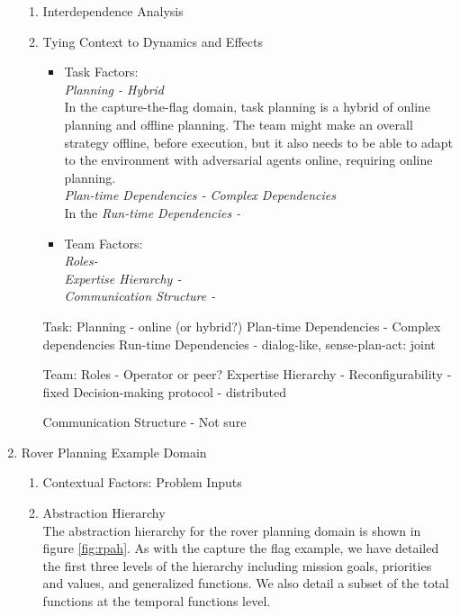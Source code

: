 \documentclass[letterpaper, 10 pt, conference]{ieeeconf}  %
\theoremstyle{definition}
\begin{document}
\begin{enumerate}
\begin{enumerate}
    \item Interdependence Analysis
    \item Tying Context to Dynamics and Effects
    \begin{itemize}
        \item Task Factors: \\
        \textit{Planning - Hybrid}\\
        In the capture-the-flag domain, task planning is a hybrid of online planning and offline planning. The team might make an overall strategy offline, before execution, but it also needs to be able to adapt to the environment with adversarial agents online, requiring online planning. \\
        \textit{Plan-time Dependencies - Complex Dependencies}\\
        In the 
        \textit{Run-time Dependencies - }\\
        \item Team Factors: \\
        \textit{Roles- }\\
        \textit{Expertise Hierarchy - }\\
        \textit{Communication Structure - }\\
    \end{itemize}
    Task:
		Planning - online (or hybrid?)
		Plan-time Dependencies - Complex dependencies
		Run-time Dependencies - dialog-like, sense-plan-act: joint

	Team:
		Roles - Operator or peer?
		Expertise Hierarchy -
			Reconfigurability - fixed
			Decision-making protocol - distributed

		Communication Structure - Not sure


\end{enumerate}


\item Rover Planning Example Domain

\begin{enumerate}
    \item Contextual Factors: Problem Inputs
    \item Abstraction Hierarchy
    \\The abstraction hierarchy for the rover planning domain is shown in figure \ref{fig:rpah}. As with the capture the flag example, we have detailed the first three levels of the hierarchy including mission goals, priorities and values, and generalized functions. We also detail a subset of the total functions at the temporal functions level. %
    

\end{enumerate}
\end{enumerate}
\end{document}
